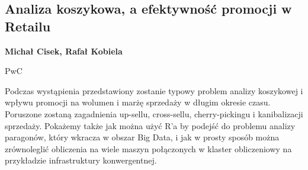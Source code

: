 \documentclass[\main/boa.tex]{subfiles}
\begin{document}
\subsection{Analiza koszykowa, a efektywność promocji w Retailu}

\begin{minipage}{0.915\textwidth}
	\centering
  {\bf {} Michał Cisek,  Rafał Kobiela}
\end{minipage}


\begin{affiliations}
\begin{minipage}{0.915\textwidth}
\centering
PwC \\[-2pt]
\end{minipage}
\end{affiliations}

\vskip 0.3cm

 Podczas wystąpienia przedstawiony zostanie typowy problem analizy koszykowej \break i wpływu promocji na wolumen i marżę sprzedaży w długim okresie czasu. Poruszone zostaną zagadnienia up-sellu, cross-sellu, cherry-pickingu i kanibalizacji sprzedaży. Pokażemy także jak można użyć R'a by podejść do problemu analizy paragonów, który wkracza w obszar Big Data, i jak w prosty sposób można zrównoleglić obliczenia na wiele maszyn połączonych w klaster obliczeniowy na przykładzie infrastruktury konwergentnej. 
\end{document}
